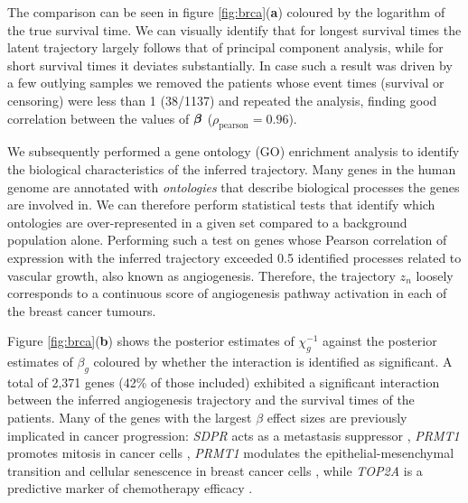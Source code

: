 The comparison can be seen in figure \ref{fig:brca}(\textbf{a}) coloured by the logarithm of the true survival time. We can visually identify that for longest survival times the latent trajectory largely follows that of principal component analysis, while for short survival times it deviates substantially. In case such a result was driven by a few outlying samples we removed the patients whose event times (survival or censoring) were less than 1 (38/1137) and repeated the analysis, finding good correlation between the values of $\bm{\beta}$ ($\rho_{\text{pearson}} = 0.96$).

We subsequently performed a gene ontology (GO) enrichment analysis to identify the biological characteristics of the inferred trajectory. Many genes in the human genome are annotated with \emph{ontologies} that describe biological processes the genes are involved in. We can therefore perform statistical tests \citep{young2010gene} that identify which ontologies are over-represented in a given set compared to a background population alone. Performing such a test on genes whose Pearson correlation of expression with the inferred trajectory exceeded 0.5 identified processes related to vascular growth, also known as angiogenesis. Therefore, the trajectory $z_n$ loosely corresponds to a continuous score of angiogenesis pathway activation in each of the breast cancer tumours.


Figure \ref{fig:brca}(\textbf{b}) shows the posterior estimates of $\chi_g^{-1}$ against the posterior estimates of $\beta_g$ coloured by whether the interaction is identified as significant. %
A total of 2,371 genes (42\% of those included) exhibited a significant interaction between the inferred angiogenesis trajectory and the survival times of the patients. Many of the genes with the largest $\beta$ effect sizes are previously implicated in cancer progression: \emph{SDPR} acts as a metastasis suppressor \citep{ozturk2016sdpr}, \emph{PRMT1} promotes mitosis in
cancer cells \citep{deng2015prmt1}, \emph{PRMT1} modulates the epithelial-mesenchymal transition and cellular senescence in breast cancer cells \citep{gao2016dual}, while \emph{TOP2A} is a predictive marker of chemotherapy efficacy \citep{wang2012top2a}.

